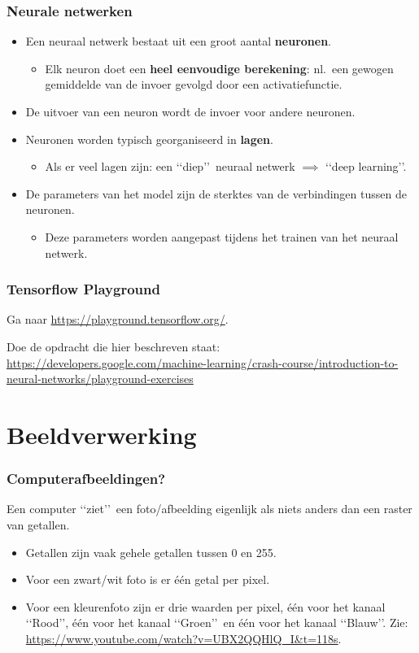 \documentclass[aspectratio=169]{beamer}
\begin{document}
\begin{frame}
\frametitle{Neurale netwerken}
\begin{itemize}
\item Een neuraal netwerk bestaat uit een groot aantal \textbf{neuronen}.
\begin{itemize}
	\item Elk neuron doet een \textbf{heel eenvoudige berekening}: nl.\ een gewogen gemiddelde 
	van de invoer gevolgd door een activatiefunctie.
\end{itemize}
\item De uitvoer van een neuron wordt de invoer voor andere neuronen.
\item Neuronen worden typisch georganiseerd in \textbf{lagen}. 
\begin{itemize}
	\item Als er veel lagen zijn: een \lq\lq diep\rq\rq\ neuraal netwerk $\implies$ \lq\lq deep learning\rq\rq.
\end{itemize}
\item De parameters van het model zijn de sterktes van de verbindingen tussen de neuronen.
\begin{itemize}
	\item Deze parameters worden aangepast tijdens het trainen van het neuraal netwerk.
\end{itemize}
\end{itemize}
\end{frame}

\begin{frame}
\frametitle{Tensorflow Playground}
Ga naar \url{https://playground.tensorflow.org/}.

\vspace{0.5cm}

Doe de opdracht die hier beschreven staat: \url{https://developers.google.com/machine-learning/crash-course/introduction-to-neural-networks/playground-exercises}
\end{frame}

\section{Beeldverwerking}

\begin{frame}
\frametitle{Computerafbeeldingen?}


Een computer \lq\lq ziet\rq\rq\ een foto/afbeelding eigenlijk als niets anders dan een raster van getallen.
\begin{itemize}
	\item Getallen zijn vaak gehele getallen tussen 0 en 255.
	\item Voor een zwart/wit foto is er \'e\'en getal per pixel.
	\item Voor een kleurenfoto zijn er drie waarden per pixel, \'e\'en voor het kanaal \lq\lq Rood\rq\rq, \'e\'en voor het kanaal \lq\lq Groen\rq\rq\ en 
	\'e\'en voor het kanaal \lq\lq Blauw\rq\rq. Zie: \url{https://www.youtube.com/watch?v=UBX2QQHlQ_I&t=118s}.
\end{itemize}
\end{frame}
\end{document}
